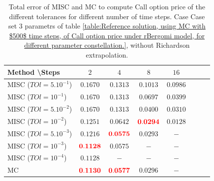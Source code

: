 \documentclass[11pt]{article}
\begin{document}
%
\begin{table}[h!]
\centering
\begin{tabular}{l*{6}{c}r}
Method \textbackslash  Steps            & $2$ & $4$ & $8$ & $16$  \\
\hline
MISC ($TOl=5.10^{-1}$)  & $\mathbf{   0.1670}$ & $\mathbf{   0.1313}$ & $\mathbf{    0.1013}$ & $\mathbf{ 0.0986}$  \\
MISC ($TOl=10^{-1}$)  &  $\mathbf{   0.1670}$ & $\mathbf{   0.1313}$ & $\mathbf{  0.0697}$ & $\mathbf{0.0399}$  \\
MISC ($TOl=5.10^{-2}$)  & $\mathbf{   0.1670}$ & $\mathbf{   0.1313}$ & $\mathbf{0.0400}$ & $\mathbf{0.0310}$  \\
MISC ($TOl=10^{-2}$)  & $\mathbf{   0.1251}$ & $\mathbf{   0.0642}$ & $\mathbf{ {\color{red}0.0294}}$ & $\mathbf{0.0128}$  \\
MISC ($TOl=5.10^{-3}$)  & $\mathbf{0.1216}$ & $\mathbf{ {\color{red}0.0575}}$ &$\mathbf{ 0.0293}$ & $\mathbf{-}$  \\
MISC ($TOl=10^{-3}$)  & $\mathbf{{\color{red}0.1128}}$ & $\mathbf{ 0.0575}$ & $\mathbf{-}$ & $\mathbf{-}$  \\
MISC ($TOl=10^{-4}$)  & $\mathbf{0.1128}$ & $\mathbf{-}$ & $\mathbf{-}$ & $\mathbf{-}$  \\
\hline
MC    &  $\mathbf{{\color{red}0.1130}}$   &$\mathbf{{\color{red}0.0577}}$ & $\mathbf{0.0296}$ & $\mathbf{-}$  \\


\hline
\end{tabular}
\caption{Total error of MISC and MC to compute Call option price of the different tolerances for different number of time steps. Case Case set $3$ parametrs of table \ref{table:Reference solution, using MC with $500$ time steps, of Call option price under rBergomi model, for different parameter constellation.}, without Richardson extrapolation.}
\label{Total error of MISC and MC to compute Call option price of the different tolerances for different number of time steps. Case set 3, without Richardson extrapolation. The numbers between parentheses are the corresponding absolute errors,linear}
\end{table}
\end{document}
